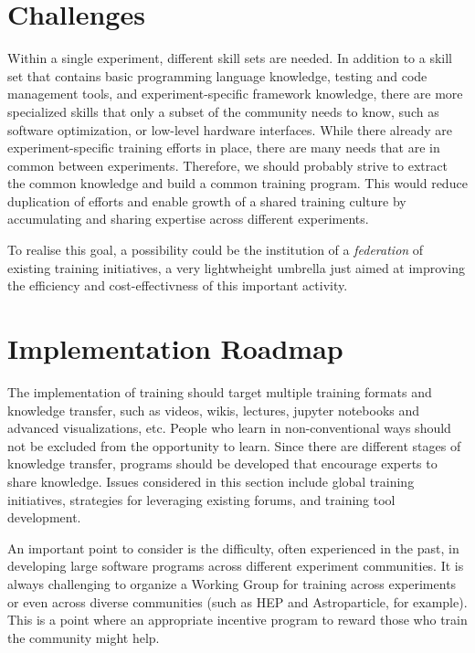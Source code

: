 \section{Challenges}

Within a single experiment, different skill sets are needed. In addition to a skill set that contains basic programming language knowledge, testing and code management tools, and experiment-specific framework knowledge, there are more specialized skills that only a subset of the community needs to know, such as software optimization, or low-level hardware interfaces.
While there already are experiment-specific training efforts in place, there are many needs that are in common between experiments. Therefore, we should probably strive to extract the common knowledge and build a common training program. This would reduce duplication of efforts and enable growth of a shared training culture by accumulating and sharing expertise across different experiments.

To realise this goal, a possibility could be the institution of a {\em federation} of existing training initiatives, a very lightwheight umbrella just aimed at improving the efficiency and cost-effectivness  
of this important activity.

\section{Implementation Roadmap}
The implementation of training should target multiple training formats and knowledge transfer, such as videos, wikis, lectures, jupyter notebooks and advanced visualizations, etc.
People who learn in non-conventional ways should not be excluded from the opportunity to learn. Since there are different stages of knowledge transfer, programs should be developed that encourage experts to share knowledge. Issues considered in this section include global training initiatives, strategies for leveraging existing forums, and training tool development.

An important point to consider is the difficulty, often experienced in the past, in developing large software programs across different experiment communities. It is always challenging to organize a Working Group for training across experiments or even across diverse communities (such as HEP and Astroparticle, for example). This is a point where an appropriate incentive program to reward those who train the community might help.

